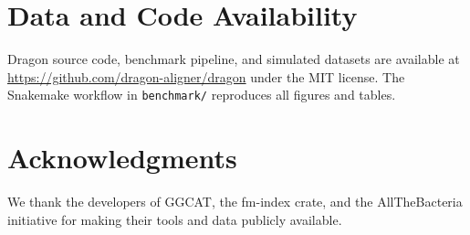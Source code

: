 \documentclass[11pt]{article}
\begin{document}
\section{Data and Code Availability}

Dragon source code, benchmark pipeline, and simulated datasets are available at \url{https://github.com/dragon-aligner/dragon} under the MIT license. The Snakemake workflow in \texttt{benchmark/} reproduces all figures and tables.

\section*{Acknowledgments}

We thank the developers of GGCAT, the fm-index crate, and the AllTheBacteria initiative for making their tools and data publicly available.


\end{document}
